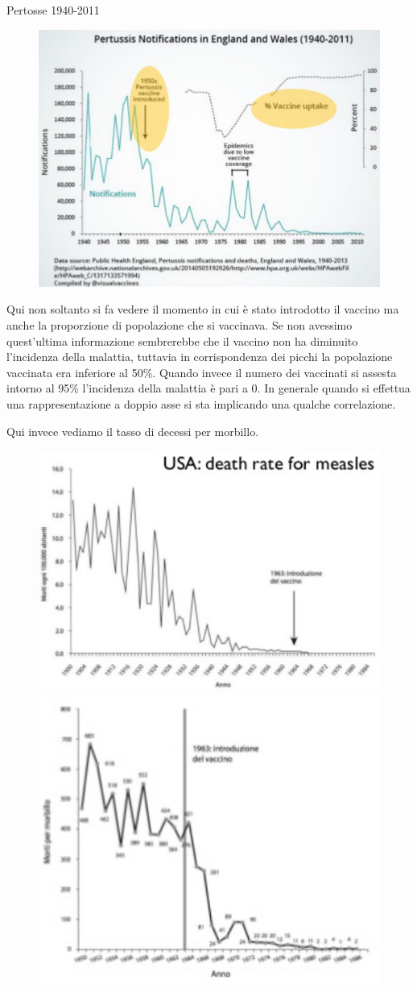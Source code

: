 \documentclass[12pt,a4paper]{report}
\begin{document}
Pertosse 1940-2011

\begin{figure}[h]
	\centering
	\includegraphics[width=0.4\linewidth]{"imgs datavis/12"}
	\caption{}
	\label{fig:12}
\end{figure}


Qui non soltanto si fa vedere il momento in cui è stato introdotto il vaccino ma anche la proporzione di popolazione che si vaccinava. Se non avessimo quest'ultima informazione sembrerebbe che il vaccino non ha diminuito l'incidenza della malattia, tuttavia in corrispondenza dei picchi la popolazione vaccinata era inferiore al 50\%. Quando invece il numero dei vaccinati si assesta intorno al 95\% l'incidenza della malattia è pari a 0. In generale quando si effettua una rappresentazione a doppio asse si sta implicando una qualche correlazione. 


Qui invece vediamo il tasso di decessi per morbillo. 

\begin{figure}[h]
	\centering
	\includegraphics[width=.40\linewidth]{imgs datavis/12a.png}\hfil
	\includegraphics[width=.40\linewidth]{imgs datavis/12b.png}
	
	\caption{}\label{}
\end{figure}
\end{document}
